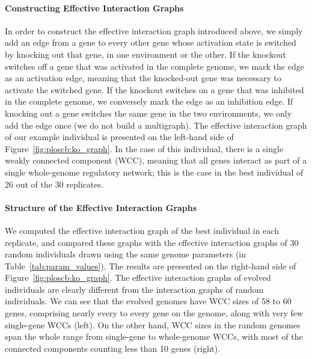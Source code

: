 \paragraph{Constructing Effective Interaction Graphs}
In order to construct the effective interaction graph introduced above, we simply add an edge from a gene to every other gene whose activation state is switched by knocking out that gene, in one environment or the other.
If the knockout switches off a gene that was activated in the complete genome, we mark the edge as an activation edge, meaning that the knocked-out gene was necessary to activate the switched gene.
If the knockout switches on a gene that was inhibited in the complete genome, we conversely mark the edge as an inhibition edge.
If knocking out a gene switches the same gene in the two environments, we only add the edge once (we do not build a multigraph).
The effective interaction graph of our example individual is presented on the left-hand side of Figure~\ref{fig:ploscb:ko_graph}.
In the case of this individual, there is a single weakly connected component (WCC), meaning that all genes interact as part of a single whole-genome regulatory network; this is the case in the best individual of 26 out of the 30 replicates.

\paragraph{Structure of the Effective Interaction Graphs}
We computed the effective interaction graph of the best individual in each replicate, and compared these graphs with the effective interaction graphs of 30 random individuals drawn using the same genome parameters (in Table~\ref{tab:param_values}).
The results are presented on the right-hand side of Figure~\ref{fig:ploscb:ko_graph}.
The effective interaction graphs of evolved individuals are clearly different from the interaction graphs of random individuals.
We can see that the evolved genomes have WCC sizes of 58 to 60 genes, comprising nearly every to every gene on the genome, along with very few single-gene WCCs (left).
On the other hand, WCC sizes in the random genomes span the whole range from single-gene to whole-genome WCCs, with most of the connected components counting less than 10 genes (right).

